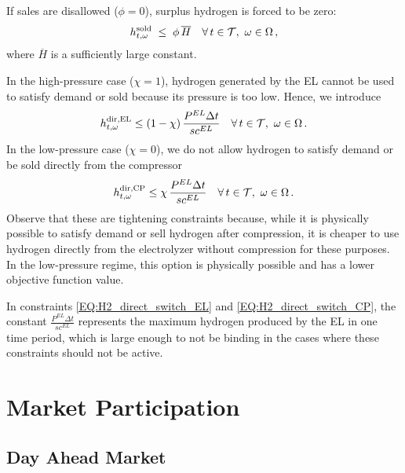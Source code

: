 \documentclass{article}
\begin{document}
\medskip

If sales are disallowed (\(\phi=0\)), surplus hydrogen is forced to be zero:
\begin{equation} \label{EQ:H2_sold_nosell}
  h^{\rm sold}_{t,\omega} \;\le\; \phi\, 
  \overline{H} \quad\forall\,t\in\mathcal{T},\ \omega\in\Omega\,,
\end{equation}
where $\overline{H}$ is a sufficiently large constant.

In the high-pressure case ($\chi = 1$), hydrogen generated by the EL cannot be used to satisfy demand or sold because its pressure is too low. Hence, we introduce
\begin{equation}
  h^{\rm dir,EL}_{t,\omega} \le (1-\chi)\, \frac{P^{EL} \Delta t}{sc^{EL}}
  \quad\forall\,t\in\mathcal{T},\ \omega\in\Omega\,.
  \label{EQ:H2_direct_switch_EL}
\end{equation}
In the low-pressure case ($\chi = 0$), we do not allow hydrogen to satisfy demand or be sold directly from the compressor
\begin{equation}
  h^{\rm dir,CP}_{t,\omega} \le \chi\, \frac{P^{EL} \Delta t}{sc^{EL}} \quad\forall\,t\in\mathcal{T},\ \omega\in\Omega\,.
  \label{EQ:H2_direct_switch_CP}
\end{equation}
Observe that these are tightening constraints because, while it is physically possible to satisfy demand or sell hydrogen after compression, it is cheaper to use hydrogen directly from the electrolyzer without compression for these purposes. In the low-pressure regime, this option is physically possible and has a lower objective function value.

In constraints \eqref{EQ:H2_direct_switch_EL} and \eqref{EQ:H2_direct_switch_CP}, the constant $\frac{P^{EL} \Delta t}{sc^{EL}}$ represents the maximum hydrogen produced by the EL in one time period, which is large enough to not be binding in the cases where these constraints should not be active.


\section{Market Participation}
\label{SEC:MarketParticipation}

\subsection{Day Ahead Market}
\end{document}
